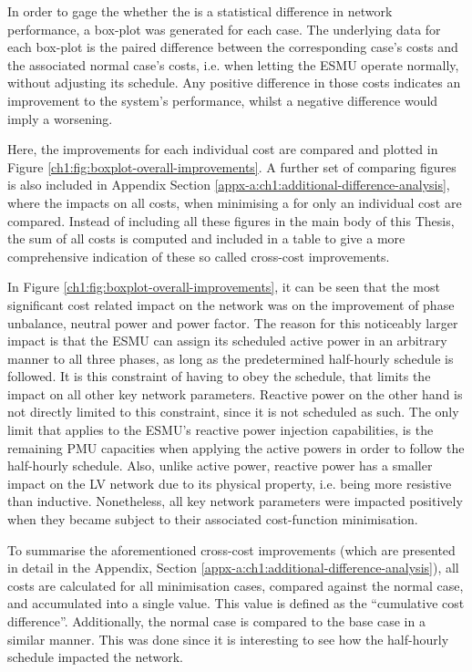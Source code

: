 In order to gage the whether the is a statistical difference in network performance, a box-plot was generated for each case.
The underlying data for each box-plot is the paired difference between the corresponding case's costs and the associated normal case's costs, i.e. when letting the ESMU operate normally, without adjusting its schedule.
Any positive difference in those costs indicates an improvement to the system's performance, whilst a negative difference would imply a worsening.

Here, the improvements for each individual cost are compared and plotted in Figure \ref{ch1:fig:boxplot-overall-improvements}.
A further set of comparing figures is also included in Appendix Section \ref{appx-a:ch1:additional-difference-analysis}, where the impacts on all costs, when minimising a for only an individual cost are compared.
Instead of including all these figures in the main body of this Thesis, the sum of all costs is computed and included in a table to give a more comprehensive indication of these so called cross-cost improvements.



In Figure \ref{ch1:fig:boxplot-overall-improvements}, it can be seen that the most significant cost related impact on the network was on the improvement of phase unbalance, neutral power and power factor.
The reason for this noticeably larger impact is that the ESMU can assign its scheduled active power in an arbitrary manner to all three phases, as long as the predetermined half-hourly schedule is followed.
It is this constraint of having to obey the schedule, that limits the impact on all other key network parameters.
Reactive power on the other hand is not directly limited to this constraint, since it is not scheduled as such.
The only limit that applies to the ESMU's reactive power injection capabilities, is the remaining PMU capacities when applying the active powers in order to follow the half-hourly schedule.
Also, unlike active power, reactive power has a smaller impact on the LV network due to its physical property, i.e. being more resistive than inductive.
Nonetheless, all key network parameters were impacted positively when they became subject to their associated cost-function minimisation.

To summarise the aforementioned cross-cost improvements (which are presented in detail in the Appendix, Section \ref{appx-a:ch1:additional-difference-analysis}), all costs are calculated for all minimisation cases, compared against the normal case, and accumulated into a single value.
This value is defined as the ``cumulative cost difference''.
Additionally, the normal case is compared to the base case in a similar manner.
This was done since it is interesting to see how the half-hourly schedule impacted the network.

